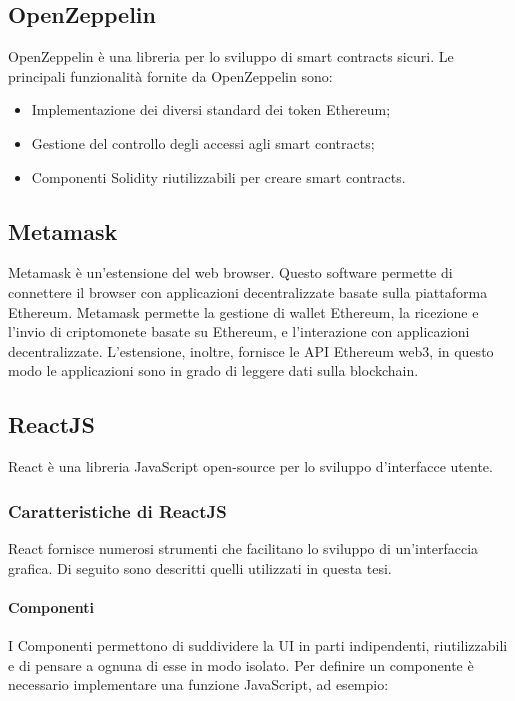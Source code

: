 \documentclass[a4paper]{article}
\begin{document}
    \subsection{OpenZeppelin}
    OpenZeppelin è una libreria per lo sviluppo di smart contracts sicuri. Le principali funzionalità fornite da OpenZeppelin sono:
    \begin{itemize}
    \item Implementazione dei diversi standard dei token Ethereum;
    \item Gestione del controllo degli accessi agli smart contracts;
    \item Componenti Solidity riutilizzabili per creare smart contracts\cite{openzeppelin}.
    \end{itemize}

    \subsection{Metamask}
    Metamask è un'estensione del web browser. Questo software permette di connettere il browser con
    applicazioni decentralizzate basate sulla piattaforma Ethereum. Metamask permette la gestione di
    wallet Ethereum, la ricezione e l'invio di criptomonete basate su Ethereum, e l'interazione con
    applicazioni decentralizzate. L'estensione, inoltre, fornisce le API Ethereum web3, in questo
    modo le applicazioni sono in grado di leggere dati sulla blockchain\cite{metamask}.

    \subsection{ReactJS}
    React è una libreria JavaScript open-source per lo sviluppo d'interfacce utente.
    \subsubsection{Caratteristiche di ReactJS}
    React fornisce numerosi strumenti che facilitano lo sviluppo di un'interfaccia grafica. Di seguito sono descritti quelli utilizzati in questa tesi.
    \paragraph{Componenti}
    I Componenti permettono di suddividere la UI in parti indipendenti, riutilizzabili e di pensare a ognuna di esse in modo isolato.
    Per definire un componente è necessario implementare una funzione JavaScript, ad esempio:
\end{document}
